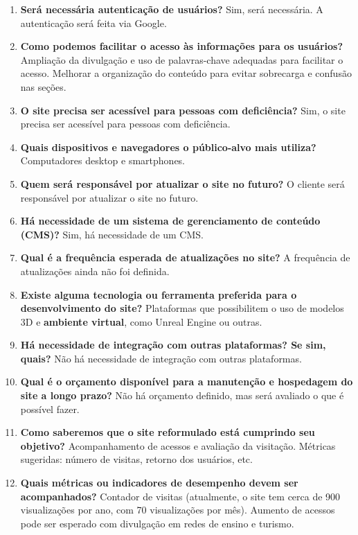 \begin{enumerate}
    \item \textbf{Será necessária autenticação de usuários?}  
    Sim, será necessária.  
    A autenticação será feita via Google.

    \item \textbf{Como podemos facilitar o acesso às informações para os usuários?}  
    Ampliação da divulgação e uso de palavras-chave adequadas para facilitar o acesso.  
    Melhorar a organização do conteúdo para evitar sobrecarga e confusão nas seções.

    \item \textbf{O site precisa ser acessível para pessoas com deficiência?}  
    Sim, o site precisa ser acessível para pessoas com deficiência.

    \item \textbf{Quais dispositivos e navegadores o público-alvo mais utiliza?}  
    Computadores desktop e smartphones.

    \item \textbf{Quem será responsável por atualizar o site no futuro?}  
    O cliente será responsável por atualizar o site no futuro.

    \item \textbf{Há necessidade de um sistema de gerenciamento de conteúdo (CMS)?}  
    Sim, há necessidade de um CMS.

    \item \textbf{Qual é a frequência esperada de atualizações no site?}  
    A frequência de atualizações ainda não foi definida.

    \item \textbf{Existe alguma tecnologia ou ferramenta preferida para o desenvolvimento do site?}  
    Plataformas que possibilitem o uso de modelos 3D e \textbf{ambiente virtual}, como Unreal Engine ou outras.

    \item \textbf{Há necessidade de integração com outras plataformas? Se sim, quais?}  
    Não há necessidade de integração com outras plataformas.

    \item \textbf{Qual é o orçamento disponível para a manutenção e hospedagem do site a longo prazo?}  
    Não há orçamento definido, mas será avaliado o que é possível fazer.

    \item \textbf{Como saberemos que o site reformulado está cumprindo seu objetivo?}  
    Acompanhamento de acessos e avaliação da visitação.  
    Métricas sugeridas: número de visitas, retorno dos usuários, etc.

    \item \textbf{Quais métricas ou indicadores de desempenho devem ser acompanhados?}  
    Contador de visitas (atualmente, o site tem cerca de 900 visualizações por ano, com 70 visualizações por mês).  
    Aumento de acessos pode ser esperado com divulgação em redes de ensino e turismo.
\end{enumerate}

